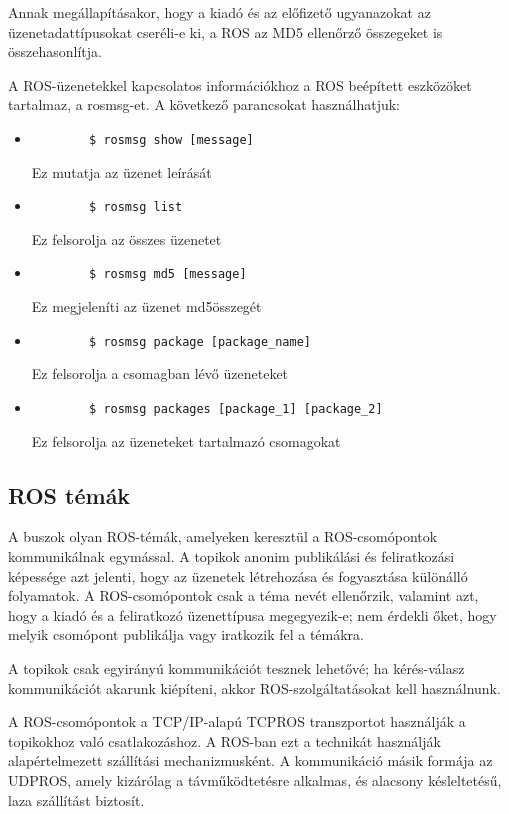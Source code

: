 \documentclass{article}
\begin{document}
Annak megállapításakor, hogy a kiadó és az előfizető ugyanazokat az üzenetadattípusokat cseréli-e ki, a ROS az MD5 ellenőrző összegeket is összehasonlítja.

A ROS-üzenetekkel kapcsolatos információkhoz a ROS beépített eszközöket tartalmaz, a rosmsg-et. A következő parancsokat használhatjuk: 
\begin{itemize}
    \item
    \begin{verbatim}
        $ rosmsg show [message]
    \end{verbatim}Ez mutatja az üzenet leírását
    \item
    \begin{verbatim}
        $ rosmsg list
    \end{verbatim}Ez felsorolja az összes üzenetet
    \item
    \begin{verbatim}
        $ rosmsg md5 [message]
    \end{verbatim}Ez megjeleníti az üzenet md5összegét
    \item
    \begin{verbatim}
        $ rosmsg package [package_name]
    \end{verbatim}Ez felsorolja a csomagban lévő üzeneteket
    \item
    \begin{verbatim}
        $ rosmsg packages [package_1] [package_2]
    \end{verbatim}Ez felsorolja az üzeneteket tartalmazó csomagokat
\end{itemize}

\subsection{ROS témák}
A buszok olyan ROS-témák, amelyeken keresztül a ROS-csomópontok kommunikálnak egymással. A topikok anonim publikálási és feliratkozási képessége azt jelenti, hogy az üzenetek létrehozása és fogyasztása különálló folyamatok. A ROS-csomópontok csak a téma nevét ellenőrzik, valamint azt, hogy a kiadó és a feliratkozó üzenettípusa megegyezik-e; nem érdekli őket, hogy melyik csomópont publikálja vagy iratkozik fel a témákra.

A topikok csak egyirányú kommunikációt tesznek lehetővé; ha kérés-válasz kommunikációt akarunk kiépíteni, akkor ROS-szolgáltatásokat kell használnunk.

A ROS-csomópontok a TCP/IP-alapú TCPROS transzportot használják a topikokhoz való csatlakozáshoz. A ROS-ban ezt a technikát használják alapértelmezett szállítási mechanizmusként. A kommunikáció másik formája az UDPROS, amely kizárólag a távműködtetésre alkalmas, és alacsony késleltetésű, laza szállítást biztosít.
\end{document}
